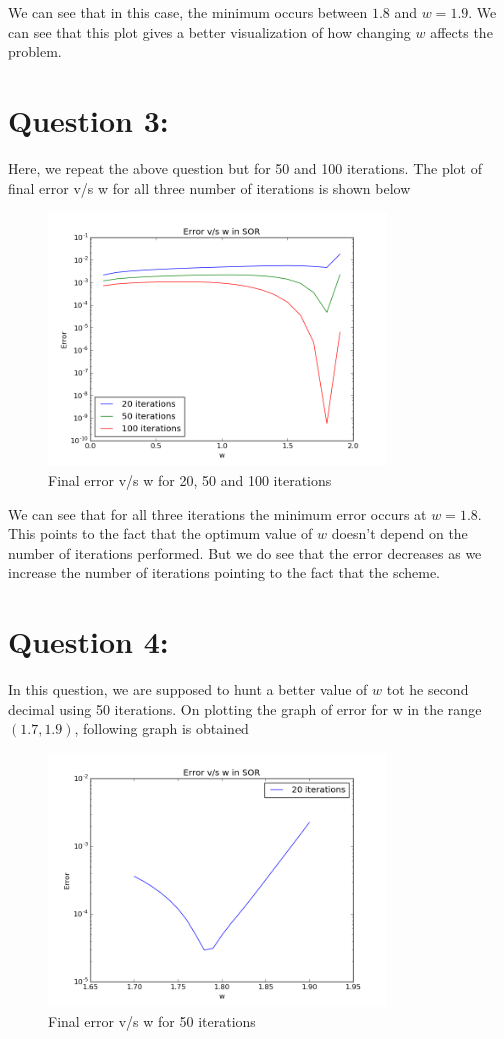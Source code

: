 \documentclass[11pt, a4paper]{article}
\begin{document}
We can see that in this case, the minimum occurs between $1.8$ and $w=1.9$. We can see that this plot gives a better visualization
of how changing $w$ affects the problem.


\section{Question 3:}
\label{Question3}
Here, we repeat the above question but for 50 and 100 iterations. The plot of final error v/s w for all three number of 
iterations is shown below
\begin{figure}[H]
 \centering
 \includegraphics[width = 0.8\textwidth]{nmaxhigh.png}
 \caption{Final error v/s w for 20, 50 and 100 iterations}
\end{figure}

We can see that for all three iterations the minimum error occurs at $w=1.8$. This points to the fact that the optimum value
of $w$ doesn't depend on the number of iterations performed. But we do see that the error decreases as we increase the number
of iterations pointing to the fact that the scheme.

\section{Question 4:}
\label{Question4}
In this question, we are supposed to hunt a better value of $w$ tot he second decimal using 50 iterations. On plotting the graph
of error for w in the range $(1.7, 1.9)$, following graph is obtained
\begin{figure}[H]
 \centering
 \includegraphics[width = 0.8\textwidth]{optw.png}
 \caption{Final error v/s w for 50 iterations}
\end{figure}
\end{document}
